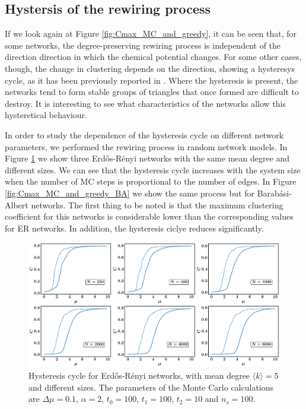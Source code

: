 \documentclass{article}
\begin{document}
\subsection{Hystersis of the rewiring process}

If we look again at Figure \ref{fig:Cmax_MC_and_greedy}, it can be seen that, for some networks, the degree-preserving rewiring process is independent of the direction direction in which the chemical potential changes. For some other cases, though, the change in clustering depends on the direction, showing a hysteresys cycle, as it has been previously reported in \cite{Foster2010CommunitiesEnsembles}. Where the hysteresis is present, the networks tend to form stable groups of triangles that once formed are difficult to destroy. It is interesting to see what characteristics of the networks allow this hysteretical behaviour.

In order to study the dependence of the hysteresis cycle on different network parameters, we performed the rewiring process in random network models. In Figure \ref{fig:Cmax_MC_and_greedy_ER} we show three Erd\H{o}s-R\'enyi networks with the same mean degree and different sizes. We can see that the hysteresis cycle increases with the system size when the number of MC steps is proportional to the number of edges. In Figure \ref{fig:Cmax_MC_and_greedy_BA} we show the same process but for Barab\'asi-Albert networks. The first thing to be noted is that the maximum clustering coefficient for this networks is considerable lower than the corresponding values for ER networks. In addition, the hysteresis ciclye reduces significantly. 

\begin{figure}[ht!]
\centering
\includegraphics[scale=0.27]{./figs/Cmax_MC_and_greedy_ER}
\caption{Hysteresis cycle for Erd\H{o}s-R\'enyi networks, with mean degree $\langle k \rangle = 5$ and different sizes. The parameters of the Monte Carlo calculations are $\Delta \mu = 0.1$, $\alpha=2$, $t_0 = 100$, $t_1 = 100$, $t_2 = 10$ and $n_s = 100$.}
\label{fig:Cmax_MC_and_greedy_ER}
\end{figure}
\end{document}

